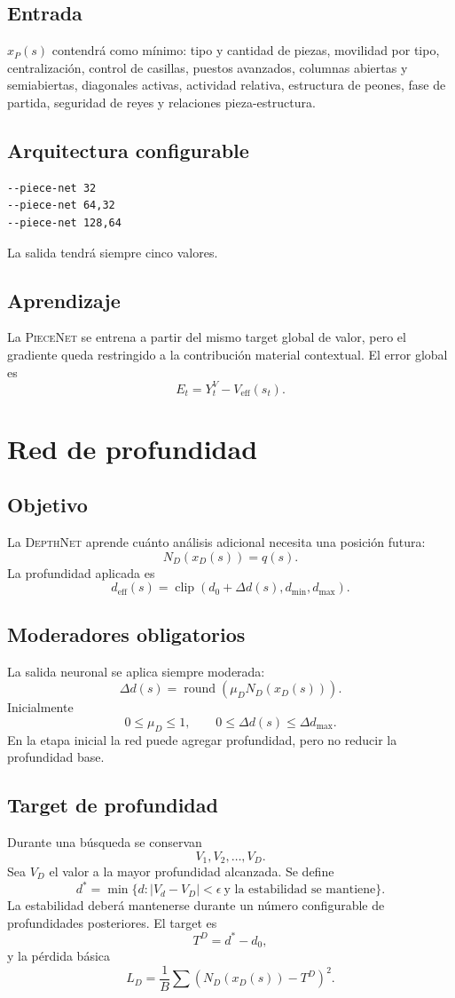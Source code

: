 \documentclass[11pt,a4paper]{article}
\newcommand{\PieceNet}{\textsc{PieceNet}}
\newcommand{\DepthNet}{\textsc{DepthNet}}
\begin{document}
\subsection{Entrada}
$x_P(s)$ contendrá como mínimo: tipo y cantidad de piezas, movilidad por tipo, centralización, control de casillas, puestos avanzados, columnas abiertas y semiabiertas, diagonales activas, actividad relativa, estructura de peones, fase de partida, seguridad de reyes y relaciones pieza-estructura.

\subsection{Arquitectura configurable}
\begin{lstlisting}
--piece-net 32
--piece-net 64,32
--piece-net 128,64
\end{lstlisting}
La salida tendrá siempre cinco valores.

\subsection{Aprendizaje}
La \PieceNet{} se entrena a partir del mismo target global de valor, pero el gradiente queda restringido a la contribución material contextual. El error global es
\[
E_t=Y_t^V-V_{\mathrm{eff}}(s_t).
\]

\section{Red de profundidad}
\subsection{Objetivo}
La \DepthNet{} aprende cuánto análisis adicional necesita una posición futura:
\[
N_D(x_D(s))=q(s).
\]
La profundidad aplicada es
\[
d_{\mathrm{eff}}(s)=\operatorname{clip}(d_0+\Delta d(s),d_{\min},d_{\max}).
\]

\subsection{Moderadores obligatorios}
La salida neuronal se aplica siempre moderada:
\[
\Delta d(s)=\operatorname{round}(\mu_DN_D(x_D(s))).
\]
Inicialmente
\[
0\le\mu_D\le1,
\qquad
0\le\Delta d(s)\le\Delta d_{\max}.
\]
En la etapa inicial la red puede agregar profundidad, pero no reducir la profundidad base.

\subsection{Target de profundidad}
Durante una búsqueda se conservan
\[
V_1,V_2,\ldots,V_D.
\]
Sea $V_D$ el valor a la mayor profundidad alcanzada. Se define
\[
d^*=\min\{d:|V_d-V_D|<\epsilon\ \text{y la estabilidad se mantiene}\}.
\]
La estabilidad deberá mantenerse durante un número configurable de profundidades posteriores. El target es
\[
T^D=d^*-d_0,
\]
y la pérdida básica
\[
L_D=\frac1B\sum\left(N_D(x_D(s))-T^D\right)^2.
\]
\end{document}

